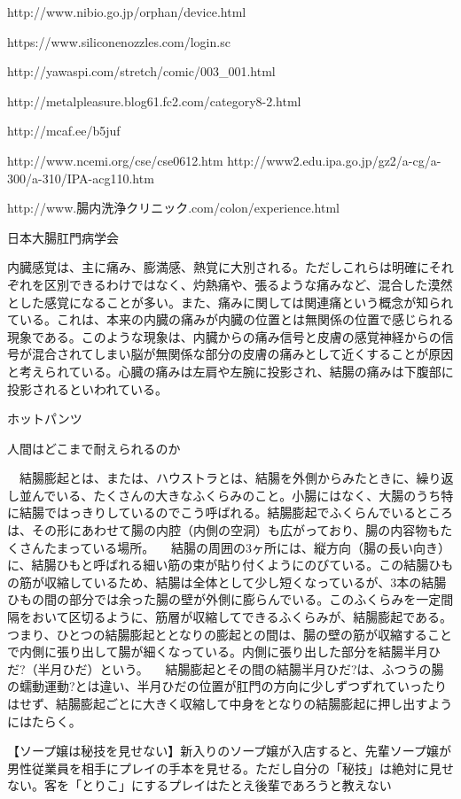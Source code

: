 http://www.nibio.go.jp/orphan/device.html

https://www.siliconenozzles.com/login.sc

http://yawaspi.com/stretch/comic/003_001.html

http://metalpleasure.blog61.fc2.com/category8-2.html

http://mcaf.ee/b5juf


http://www.ncemi.org/cse/cse0612.htm
http://www2.edu.ipa.go.jp/gz2/a-cg/a-300/a-310/IPA-acg110.htm

http://www.腸内洗浄クリニック.com/colon/experience.html


日本大腸肛門病学会

内臓感覚は、主に痛み、膨満感、熱覚に大別される。ただしこれらは明確にそれぞれを区別できるわけではなく、灼熱痛や、張るような痛みなど、混合した漠然とした感覚になることが多い。また、痛みに関しては関連痛という概念が知られている。これは、本来の内臓の痛みが内臓の位置とは無関係の位置で感じられる現象である。このような現象は、内臓からの痛み信号と皮膚の感覚神経からの信号が混合されてしまい脳が無関係な部分の皮膚の痛みとして近くすることが原因と考えられている。心臓の痛みは左肩や左腕に投影され、結腸の痛みは下腹部に投影されるといわれている。


ホットパンツ

人間はどこまで耐えられるのか

　結腸膨起とは、または、ハウストラとは、結腸を外側からみたときに、繰り返し並んでいる、たくさんの大きなふくらみのこと。小腸にはなく、大腸のうち特に結腸ではっきりしているのでこう呼ばれる。結腸膨起でふくらんでいるところは、その形にあわせて腸の内腔（内側の空洞）も広がっており、腸の内容物もたくさんたまっている場所。
　結腸の周囲の3ヶ所には、縦方向（腸の長い向き）に、結腸ひもと呼ばれる細い筋の束が貼り付くようにのびている。この結腸ひもの筋が収縮しているため、結腸は全体として少し短くなっているが、3本の結腸ひもの間の部分では余った腸の壁が外側に膨らんでいる。このふくらみを一定間隔をおいて区切るように、筋層が収縮してできるふくらみが、結腸膨起である。つまり、ひとつの結腸膨起ととなりの膨起との間は、腸の壁の筋が収縮することで内側に張り出して腸が細くなっている。内側に張り出した部分を結腸半月ひだ?（半月ひだ）という。
　結腸膨起とその間の結腸半月ひだ?は、ふつうの腸の蠕動運動?とは違い、半月ひだの位置が肛門の方向に少しずつずれていったりはせず、結腸膨起ごとに大きく収縮して中身をとなりの結腸膨起に押し出すようにはたらく。


【ソープ嬢は秘技を見せない】新入りのソープ嬢が入店すると、先輩ソープ嬢が男性従業員を相手にプレイの手本を見せる。ただし自分の「秘技」は絶対に見せない。客を「とりこ」にするプレイはたとえ後輩であろうと教えない

